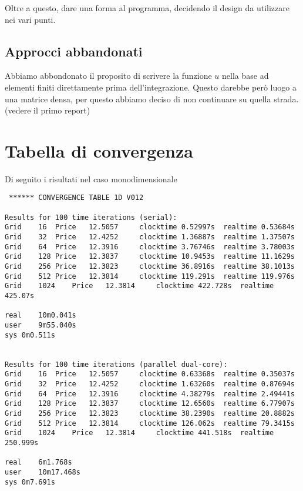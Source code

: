 \documentclass[a4paper,10pt]{article}
\begin{document}
Oltre a questo, dare una forma al programma, decidendo il design da utilizzare nei vari punti. 

\subsection{Approcci abbandonati}
Abbiamo abbondonato il proposito di scrivere la funzione $u$ nella base ad elementi finiti direttamente prima dell'integrazione. Questo darebbe però luogo a una matrice densa, per questo abbiamo deciso di non continuare su quella strada. (vedere il primo report)


\clearpage
\appendix
\section{Tabella di convergenza}
\label{app:conver}
Di seguito i risultati nel caso monodimensionale
\begin{verbatim}
 ****** CONVERGENCE TABLE 1D V012

Results for 100 time iterations (serial):
Grid	16	Price	12.5057		clocktime 0.52997s	realtime 0.53684s
Grid	32	Price	12.4252		clocktime 1.36887s	realtime 1.37507s
Grid	64	Price	12.3916		clocktime 3.76746s	realtime 3.78003s
Grid	128	Price	12.3837		clocktime 10.9453s	realtime 11.1629s
Grid	256	Price	12.3823		clocktime 36.8916s	realtime 38.1013s
Grid	512	Price	12.3814		clocktime 119.291s	realtime 119.976s
Grid	1024	Price	12.3814		clocktime 422.728s	realtime 425.07s

real	10m0.041s
user	9m55.040s
sys	0m0.511s


Results for 100 time iterations (parallel dual-core):
Grid	16	Price	12.5057		clocktime 0.63368s	realtime 0.35037s
Grid	32	Price	12.4252		clocktime 1.63260s	realtime 0.87694s
Grid	64	Price	12.3916		clocktime 4.38279s	realtime 2.49441s
Grid	128	Price	12.3837		clocktime 12.6560s	realtime 6.77907s
Grid	256	Price	12.3823		clocktime 38.2390s	realtime 20.8882s
Grid	512	Price	12.3814		clocktime 126.062s	realtime 79.3415s
Grid	1024	Price	12.3814		clocktime 441.518s	realtime 250.999s

real	6m1.768s
user	10m17.468s
sys	0m7.691s

\end{verbatim}
\end{document}
